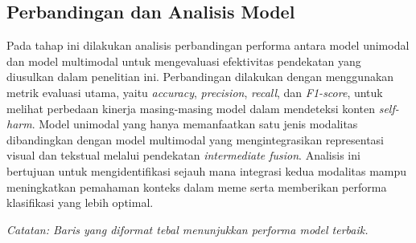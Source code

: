 \subsection{Perbandingan dan Analisis Model} \label{IV.Perbandingan}
Pada tahap ini dilakukan analisis perbandingan performa antara model unimodal dan model multimodal untuk mengevaluasi efektivitas pendekatan yang diusulkan dalam penelitian ini. Perbandingan dilakukan dengan menggunakan metrik evaluasi utama, yaitu \textit{accuracy}, \textit{precision}, \textit{recall}, dan \textit{F1-score}, untuk melihat perbedaan kinerja masing-masing model dalam mendeteksi konten \textit{self-harm}. Model unimodal yang hanya memanfaatkan satu jenis modalitas dibandingkan dengan model multimodal yang mengintegrasikan representasi visual dan tekstual melalui pendekatan \textit{intermediate fusion}. Analisis ini bertujuan untuk mengidentifikasi sejauh mana integrasi kedua modalitas mampu meningkatkan pemahaman konteks dalam meme serta memberikan performa klasifikasi yang lebih optimal.

\begin{table}[H]
    \centering
    \caption{Perbandingan Performa Model}
    \label{table:4.perbandingan_model}
    \small
    \setlength{\tabcolsep}{6pt} %
    \renewcommand{\arraystretch}{1.2}
    
    \smallskip
    \begin{flushleft}
    \small \textit{Catatan: Baris yang diformat tebal menunjukkan performa model terbaik.}
    \end{flushleft}
\end{table}

